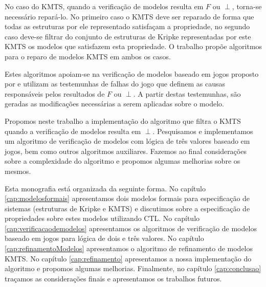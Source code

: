 \documentclass[normaltoc,capchap,capsec,times]{abnt}
\begin{document}


No caso do KMTS, quando a verificação de modelos resulta em $F$ ou $\perp$, torna-se necessário repará-lo.
No primeiro caso o KMTS deve ser reparado de forma que todas as estruturas por ele representado satisfaçam a propriedade, no segundo caso deve-se filtrar do conjunto de estruturas de Kripke representadas por este KMTS os modelos que satisfazem esta propriedade. O trabalho \cite{aline} propõe algoritmos para o reparo de modelos KMTS em ambos os casos.

Estes algoritmos apoiam-se  na verificação de modelos baseado em jogos proposto por \cite{grumberglosing} e utilizam as testemunhas de falhas do jogo que definem as causas responsáveis pelos resultados de $F$ ou $\perp$. %
A partir destas testemunhas, são geradas as modificações necessárias a serem aplicadas sobre o modelo.

Propomos neste trabalho a implementação do algoritmo que filtra o KMTS quando a verificação de modelos resulta em $\perp$. Pesquisamos e implementamos um algoritmo de verificação de modelos com lógica de três valores baseado em jogos, bem como outros algoritmos auxiliares. Fazemos ao final considerações sobre a complexidade do algoritmo e propomos algumas melhorias sobre os mesmos.

Esta monografia está organizada da seguinte forma. No capítulo \ref{cap:modelosformais} apresentamos dois modelos formais para especificação de sistemas (estruturas de Kripke e KMTS) e discutimos sobre a especificação de propriedades sobre estes modelos utilizando CTL. No capítulo \ref{cap:verificacaodemodelos} apresentamos os algoritmos de verificação de modelos baseado em jogos para lógica de dois e três valores. No capítulo \ref{cap:refinamentoModelos} apresentamos o algoritmo de refinamento de modelos KMTS. No capítulo \ref{cap:refinamento} apresentamos a nossa implementação do algoritmo e propomos algumas melhorias. Finalmente, no capítulo \ref{cap:conclusao} traçamos as considerações finais e apresentamos os trabalhos futuros.
\end{document}
